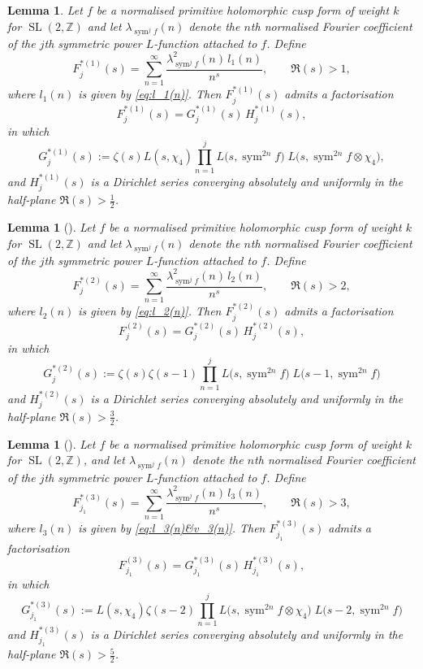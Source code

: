 \documentclass[10pt]{amsart}
\newtheorem{lemma}[theorem]{Lemma}
\begin{document}
\begin{lemma} \label{lem:F1*}
Let \(f\) be a normalised primitive holomorphic cusp form of weight \(k\) for \(\operatorname{SL}(2,\mathbb{Z})\)
and let \(\lambda_{\operatorname{sym}^{j}f}(n)\) denote the \(n\)th normalised Fourier coefficient 
of the \(j\)th symmetric power \(L\)-function attached to \(f\). Define
\[
F_{j}^{*(1)}(s)=\sum_{n=1}^{\infty}\frac{\lambda_{\operatorname{sym}^{j}f}^2(n)\,l_1(n)}{n^{s}}, \qquad \Re(s)>1,
\]
where \(l_1(n)\) is given by \eqref{eq:l_1(n)}. Then \(F_{j}^{*(1)}(s)\) admits a factorisation
\[
F_{j}^{*(1)}(s)=G_{j}^{*(1)}(s)\,H_{j}^{*(1)}(s),
\]
in which
\[
G_{j}^{*(1)}(s):=\zeta(s)L(s,\chi_4)\prod_{n=1}^{j}L\!\bigl(s,\operatorname{sym}^{2n}f \bigr)\; 
        L\!\bigl(s,\operatorname{sym}^{2n}f\otimes\chi_4\bigr),
\]
and \(H_{j}^{*(1)}(s)\) is a Dirichlet series converging absolutely and uniformly 
in the half-plane \(\Re(s)>\frac{1}{2}\).
\end{lemma}



\begin{lemma}[{\cite{Hua2022}}]\label{lem:F2*}
Let \(f\) be a normalised primitive holomorphic cusp form of weight \(k\) for \(\operatorname{SL}(2,\mathbb{Z})\)
and let \(\lambda_{\operatorname{sym}^{j}f}(n)\) denote the \(n\)th normalised Fourier coefficient 
of the \(j\)th symmetric power \(L\)-function attached to \(f\). Define
\[
F_{j}^{*(2)}(s)=\sum_{n=1}^{\infty}\frac{\lambda_{\operatorname{sym}^{j}f}^2(n)\,l_2(n)}{n^{s}}, \qquad \Re(s)>2,
\]
where \(l_2(n)\) is given by \eqref{eq:l_2(n)}. Then \(F_{j}^{*(2)}(s)\) admits a factorisation
\[
F_{j}^{(2)}(s)=G_{j}^{*(2)}(s)\,H_{j}^{*(2)}(s),
\]
in which
\[
G_{j}^{*(2)}(s):=\zeta(s)\zeta(s-1)\prod_{n=1}^{j}L\!\bigl(s,\operatorname{sym}^{2n}f \bigr)\; 
        L\!\bigl(s-1,\operatorname{sym}^{2n}f\bigr)
\]
and \(H_{j}^{*(2)}(s)\) is a Dirichlet series converging absolutely and uniformly 
in the half-plane \(\Re(s)>\frac{3}{2}\).
\end{lemma}

\begin{lemma}[{\cite{SharmaSankaranarayanan2023}}]\label{lem:F3*'}
Let \(f\) be a normalised primitive holomorphic cusp form of weight \(k\) for \(\operatorname{SL}(2,\mathbb{Z})\), 
and let \(\lambda_{\operatorname{sym}^{j}f}(n)\) denote the \(n\)th normalised Fourier coefficient 
of the \(j\)th symmetric power \(L\)-function attached to \(f\). Define
\[
F_{j_1}^{*(3)}(s)=\sum_{n=1}^{\infty}\frac{\lambda_{\operatorname{sym}^{j}f}^2(n)\,l_3(n)}{n^{s}}, \qquad \Re(s)>3,
\]
where \(l_3(n)\) is given by \eqref{eq:l_3(n)&v_3(n)}. Then \(F_{j_1}^{*(3)}(s)\) admits a factorisation
\[
F_{j_1}^{(3)}(s)=G_{j_1}^{*(3)}(s)\,H_{j_1}^{*(3)}(s),
\]
in which
\[
G_{j_1}^{*(3)}(s):=L(s,\chi_4)\zeta(s-2)\prod_{n=1}^{j}L\!\bigl(s,\operatorname{sym}^{2n}f \otimes \chi_4\bigr)\; 
        L\!\bigl(s-2,\operatorname{sym}^{2n}f\bigr)
\]
and \(H_{j_1}^{*(3)}(s)\) is a Dirichlet series converging absolutely and uniformly 
in the half-plane \(\Re(s)>\frac{5}{2}\).
\end{lemma}
\end{document}
